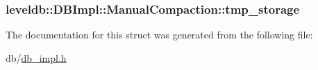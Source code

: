 \hypertarget{structleveldb_1_1_d_b_impl_1_1_manual_compaction_acfd5de0d18f7df7d222f1c09e500c9bc}{
\subsubsection[{tmp\-\_\-storage}]{ leveldb\-::\-D\-B\-Impl\-::\-Manual\-Compaction\-::tmp\-\_\-storage}}\label{structleveldb_1_1_d_b_impl_1_1_manual_compaction_acfd5de0d18f7df7d222f1c09e500c9bc}


The documentation for this struct was generated from the following file\-:\begin{DoxyCompactItemize}
\item 
db/\hyperlink{db__impl_8h}{db\-\_\-impl.\-h}\end{DoxyCompactItemize}
